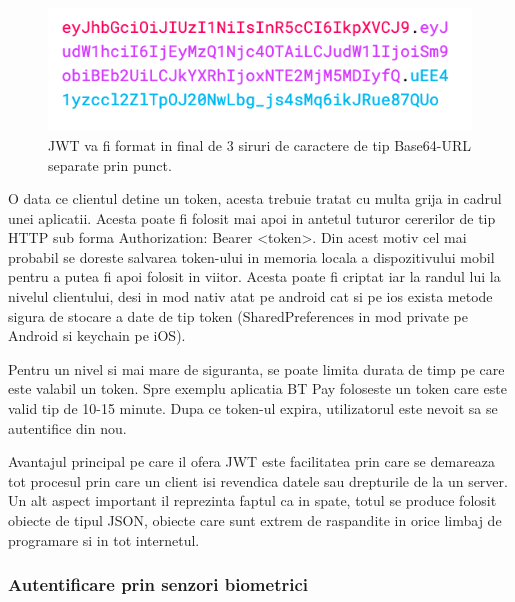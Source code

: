 \documentclass[a4paper]{article}
\begin{document}
\begin{figure}[H]
    \begin{minipage}[c]{0.67\textwidth}
        \includegraphics[width=\textwidth]{jwt-all.png}
    \end{minipage}\hfill
    \begin{minipage}[c]{0.3\textwidth}
        \caption{
            JWT va fi format in final 
            de 3 siruri de caractere de tip Base64-URL separate prin punct. }
    \end{minipage}
\end{figure}


O data ce clientul detine un token, acesta trebuie tratat cu multa grija 
in cadrul unei aplicatii. Acesta poate fi folosit mai apoi in antetul tuturor 
cererilor de tip HTTP sub forma Authorization: Bearer <token>. Din acest motiv 
cel mai probabil se doreste salvarea token-ului in memoria locala a dispozitivului
mobil pentru a putea fi apoi folosit in viitor. Acesta poate fi criptat iar la randul 
lui la nivelul clientului, desi in mod nativ atat pe android cat si pe ios exista metode
sigura de stocare a date de tip token (SharedPreferences in mod private pe Android si
keychain pe iOS).

Pentru un nivel si mai mare de siguranta, se poate limita durata de timp
pe care este valabil un token. Spre exemplu aplicatia BT Pay foloseste un token
care este valid tip de 10-15 minute. Dupa ce token-ul expira, utilizatorul este nevoit
sa se autentifice din nou.

Avantajul principal pe care il ofera JWT este facilitatea prin care se demareaza tot procesul
prin care un client isi revendica datele sau drepturile de la un server. 
Un alt aspect important il reprezinta faptul ca in spate, totul se produce folosit obiecte
de tipul JSON, obiecte care sunt extrem de raspandite in orice limbaj de programare
si in tot internetul.

\subsubsection{Autentificare prin senzori biometrici}
\end{document}
